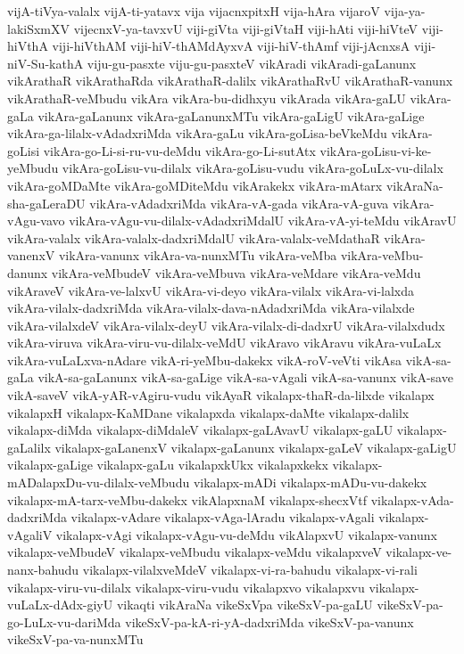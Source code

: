{vijA-tiVya-valalx
vijA-ti-yatavx
vija
vijacnxpitxH
vija-hAra
vijaroV
vija-ya-lakiSxmXV
vijecnxV-ya-tavxvU
viji-giVta
viji-giVtaH
viji-hAti
viji-hiVteV
viji-hiVthA
viji-hiVthAM
viji-hiV-thAMdAyxvA
viji-hiV-thAmf
viji-jAcnxsA
viji-niV-Su-kathA
viju-gu-pasxte
viju-gu-pasxteV
vikAradi
vikAradi-gaLanunx
vikArathaR
vikArathaRda
vikArathaR-dalilx
vikArathaRvU
vikArathaR-vanunx
vikArathaR-veMbudu
vikAra
vikAra-bu-didhxyu
vikArada
vikAra-gaLU
vikAra-gaLa
vikAra-gaLanunx
vikAra-gaLanunxMTu
vikAra-gaLigU
vikAra-gaLige
vikAra-ga-lilalx-vAdadxriMda
vikAra-gaLu
vikAra-goLisa-beVkeMdu
vikAra-goLisi
vikAra-go-Li-si-ru-vu-deMdu
vikAra-go-Li-sutAtx
vikAra-goLisu-vi-ke-yeMbudu
vikAra-goLisu-vu-dilalx
vikAra-goLisu-vudu
vikAra-goLuLx-vu-dilalx
vikAra-goMDaMte
vikAra-goMDiteMdu
vikArakekx
vikAra-mAtarx
vikAraNa-sha-gaLeraDU
vikAra-vAdadxriMda
vikAra-vA-gada
vikAra-vA-guva
vikAra-vAgu-vavo
vikAra-vAgu-vu-dilalx-vAdadxriMdalU
vikAra-vA-yi-teMdu
vikAravU
vikAra-valalx
vikAra-valalx-dadxriMdalU
vikAra-valalx-veMdathaR
vikAra-vanenxV
vikAra-vanunx
vikAra-va-nunxMTu
vikAra-veMba
vikAra-veMbu-danunx
vikAra-veMbudeV
vikAra-veMbuva
vikAra-veMdare
vikAra-veMdu
vikAraveV
vikAra-ve-lalxvU
vikAra-vi-deyo
vikAra-vilalx
vikAra-vi-lalxda
vikAra-vilalx-dadxriMda
vikAra-vilalx-dava-nAdadxriMda
vikAra-vilalxde
vikAra-vilalxdeV
vikAra-vilalx-deyU
vikAra-vilalx-di-dadxrU
vikAra-vilalxdudx
vikAra-viruva
vikAra-viru-vu-dilalx-veMdU
vikAravo
vikAravu
vikAra-vuLaLx
vikAra-vuLaLxva-nAdare
vikA-ri-yeMbu-dakekx
vikA-roV-veVti
vikAsa
vikA-sa-gaLa
vikA-sa-gaLanunx
vikA-sa-gaLige
vikA-sa-vAgali
vikA-sa-vanunx
vikA-save
vikA-saveV
vikA-yAR-vAgiru-vudu
vikAyaR
vikalapx-thaR-da-lilxde
vikalapx
vikalapxH
vikalapx-KaMDane
vikalapxda
vikalapx-daMte
vikalapx-dalilx
vikalapx-diMda
vikalapx-diMdaleV
vikalapx-gaLAvavU
vikalapx-gaLU
vikalapx-gaLalilx
vikalapx-gaLanenxV
vikalapx-gaLanunx
vikalapx-gaLeV
vikalapx-gaLigU
vikalapx-gaLige
vikalapx-gaLu
vikalapxkUkx
vikalapxkekx
vikalapx-mADalapxDu-vu-dilalx-veMbudu
vikalapx-mADi
vikalapx-mADu-vu-dakekx
vikalapx-mA-tarx-veMbu-dakekx
vikAlapxnaM
vikalapx-shecxVtf
vikalapx-vAda-dadxriMda
vikalapx-vAdare
vikalapx-vAga-lAradu
vikalapx-vAgali
vikalapx-vAgaliV
vikalapx-vAgi
vikalapx-vAgu-vu-deMdu
vikAlapxvU
vikalapx-vanunx
vikalapx-veMbudeV
vikalapx-veMbudu
vikalapx-veMdu
vikalapxveV
vikalapx-ve-nanx-bahudu
vikalapx-vilalxveMdeV
vikalapx-vi-ra-bahudu
vikalapx-vi-rali
vikalapx-viru-vu-dilalx
vikalapx-viru-vudu
vikalapxvo
vikalapxvu
vikalapx-vuLaLx-dAdx-giyU
vikaqti
vikAraNa
vikeSxVpa
vikeSxV-pa-gaLU
vikeSxV-pa-go-LuLx-vu-dariMda
vikeSxV-pa-kA-ri-yA-dadxriMda
vikeSxV-pa-vanunx
vikeSxV-pa-va-nunxMTu
}
